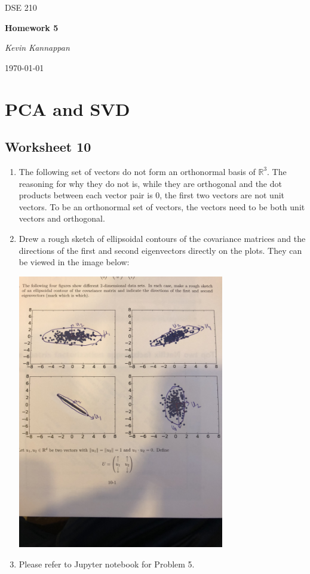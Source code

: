 \documentclass[12pt]{article}
\theoremstyle{plain}
\theoremstyle{definition}
\numberwithin{equation}{theorem}
\begin{document}
\begin{titlepage}
	\centering
	\vspace{4cm}
	{\scshape\Large DSE 210\par}
	\vspace{1.5cm}
	{\huge\bfseries Homework 5\par}
	\vspace{2cm}
	{\Large\itshape Kevin Kannappan\par}

	{\large \today\par}
\end{titlepage}


\section{PCA and SVD}
\subsection{Worksheet 10}
\begin{enumerate}
\item The following set of vectors do not form an orthonormal basis of $\mathbb{R}^{3}$. The reasoning for why they do not is, while they are orthogonal and the dot products between each vector pair is 0, the first two vectors are not unit vectors. To be an orthonormal set of vectors, the vectors need to be both unit vectors and orthogonal.
\item Drew a rough sketch of ellipsoidal contours of the covariance matrices and the directions of the first and second eigenvectors directly on the plots. They can be viewed in the image below:
\bigskip
\begin{center}
\includegraphics[width=9cm, height=12cm]{ws_10_q2}
\end{center}
\bigskip
\addtocounter{enumi}{2}
\item Please refer to Jupyter notebook for Problem 5.
\end{enumerate}
\bigskip
\end{document}
